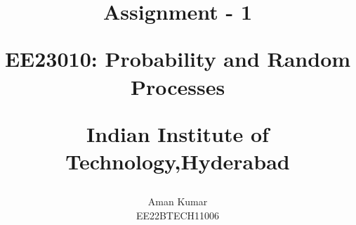 \documentclass[journal,12pt,twocolumn]{IEEEtran}
\begin{document}
%




\vspace{3cm}

\title{
Assignment - 1

\Large{EE23010: Probability and Random Processes}

Indian Institute of Technology,Hyderabad
}
\author{ Aman Kumar 

EE22BTECH11006
}	


%
%
%

% 
%



% 
\end{document}
